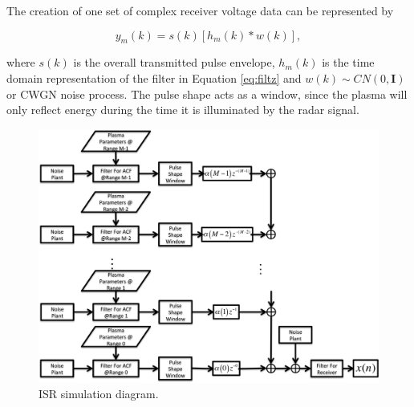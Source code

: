 \documentclass[draft,ras]{agutex}
\begin{document}
\begin{article}
The creation of one set of complex receiver voltage data can be represented by

\begin{equation}
\label{eq2}
y_m (k)= s(k)\left[h_m(k)*w(k)\right],
\end{equation}
 
\noindent where $s(k)$ is the overall transmitted pulse envelope, $h_m(k)$ is the time domain representation of the filter in Equation \ref{eq:filtz} and $w(k)\sim CN(0,\mathbf{I})$ or CWGN noise process. The pulse shape acts as a window, since the plasma will only reflect energy during the time it is illuminated by the radar signal. 

%

\begin{figure}[!h]
\centering
\includegraphics[width=7.0in]{diagram}
\caption{ISR simulation diagram.}
\label{fig:isrdiag}
\end{figure}


\end{article}
\end{document}
